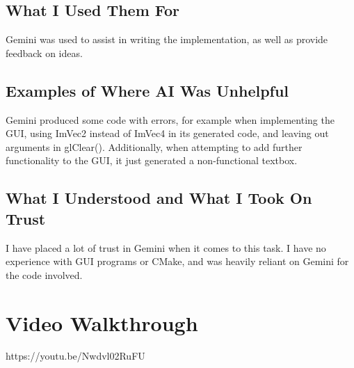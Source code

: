 \documentclass{article}
\begin{document}
\subsection{What I Used Them For}
Gemini was used to assist in writing the implementation, as well as provide feedback on ideas.
\subsection{Examples of Where AI Was Unhelpful}
Gemini produced some code with errors, for example when implementing the GUI, using ImVec2 instead of ImVec4 in its generated code, and leaving out arguments in glClear(). Additionally, when attempting to add further functionality to the GUI, it just generated a non-functional textbox.
\subsection{What I Understood and What I Took On Trust}
I have placed a lot of trust in Gemini when it comes to this task. I have no experience with GUI programs or CMake, and was heavily reliant on Gemini for the code involved.

\section{Video Walkthrough}
https://youtu.be/Nwdvl02RuFU
\end{document}
